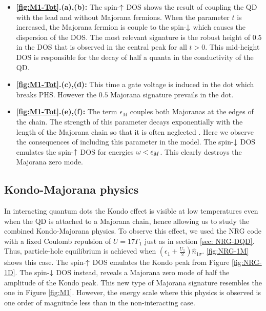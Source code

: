\begin{itemize}
    \item\textbf{ \ref{fig:M1-Tot}.(a),(b):}  The spin-$\uparrow$ DOS shows the result of coupling the QD with the lead and without Majorana fermions. When the parameter $t$ is increased, the Majorana fermion is couple to the spin-$\downarrow$ which causes the dispersion of the DOS. The most relevant signature is the robust height of $0.5$  in the DOS that is observed in the central peak for all $t>0$. This mid-height DOS is responsible for the decay of half a quanta in the conductivity of the QD.
  
    \item\textbf{ \ref{fig:M1-Tot}.(c),(d):} This time a gate voltage is induced in the dot which breaks PHS. However the $0.5$ Majorana signature prevails in the dot. 
    
    \item\textbf{ \ref{fig:M1-Tot}.(e),(f):} The term $\epsilon_M$ couples both Majoranas at the edges of the chain. The strength of this parameter decays exponentially with the length of the Majorana  chain so that it is often neglected . Here we observe the consequences of including this parameter in the model. The spin-$\downarrow$ DOS emulates the spin-$\uparrow$ DOS for energies $\omega < \epsilon_M$. This clearly destroys the Majorana zero mode.   
\end{itemize}







\subsection{Kondo-Majorana physics}

In interacting quantum dots the Kondo effect is visible at low temperatures even when the QD is attached to a Majorana chain, hence allowing us to study the combined Kondo-Majorana physics. To observe this effect, we used the NRG code with a fixed Coulomb repulsion of $U = 17\Gamma_1$ just as in section \ref{sec: NRG-DQD}. Thus, particle-hole equilibrium is achieved when $\left(\epsilon_{1}+\frac{U_1}{2}\right)\hat{n}_{1\sigma}$.  \ref{fig:NRG-1M} shows this case. The spin-$\uparrow$ DOS emulates the Kondo peak from Figure \ref{fig:NRG-1D}. The spin-$\downarrow$ DOS instead, reveals a Majorana zero mode of half the amplitude of the Kondo peak. This new type of Majorana signature resembles the one in Figure \ref{fig:M1}. However, the energy scale where this physics is observed is one order of magnitude less than in the non-interacting case. 

